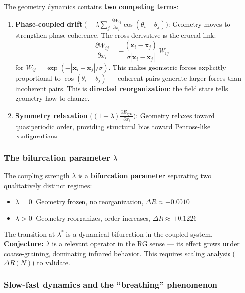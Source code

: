 \documentclass[12pt,a4paper]{article}
\theoremstyle{plain}
\theoremstyle{definition}
\begin{document}
The geometry dynamics contains \textbf{two competing terms}:
\begin{enumerate}
  \item \textbf{Phase-coupled drift}
    $\bigl(-\lambda \sum_j \frac{\partial W_{ij}}{\partial x_i}
    \cos(\theta_i - \theta_j)\bigr)$:
    Geometry moves to strengthen phase coherence.
    The cross-derivative is the crucial link:
    \begin{equation}
    \label{eq:cross_deriv}
    \frac{\partial W_{ij}}{\partial x_i}
      = -\frac{(\mathbf{x}_i - \mathbf{x}_j)}
               {\sigma |\mathbf{x}_i - \mathbf{x}_j|}\, W_{ij}
    \end{equation}
    for $W_{ij} = \exp(-|\mathbf{x}_i - \mathbf{x}_j|/\sigma)$.
    This makes geometric forces explicitly proportional to
    $\cos(\theta_i - \theta_j)$ --- coherent pairs generate larger forces
    than incoherent pairs. This is \textbf{directed reorganization}: the
    field state tells geometry how to change.

  \item \textbf{Symmetry relaxation}
    $\bigl((1-\lambda) \frac{\partial E_{\text{sym}}}{\partial x_i}\bigr)$:
    Geometry relaxes toward quasiperiodic order, providing structural bias
    toward Penrose-like configurations.
\end{enumerate}

\subsubsection{The bifurcation parameter $\lambda$}

The coupling strength $\lambda$ is a \textbf{bifurcation parameter}
separating two qualitatively distinct regimes:
\begin{itemize}
  \item $\lambda = 0$: Geometry frozen, no reorganization,
        $\Delta R \approx -0.0010$
  \item $\lambda > 0$: Geometry reorganizes, order increases,
        $\Delta R \approx +0.1226$
\end{itemize}
The transition at $\lambda^*$ is a dynamical bifurcation in the coupled
system. \textbf{Conjecture:} $\lambda$ is a relevant operator in the RG
sense --- its effect grows under coarse-graining, dominating infrared
behavior. This requires scaling analysis ($\Delta R(N)$) to validate.

\subsubsection{Slow-fast dynamics and the ``breathing'' phenomenon}
\end{document}
